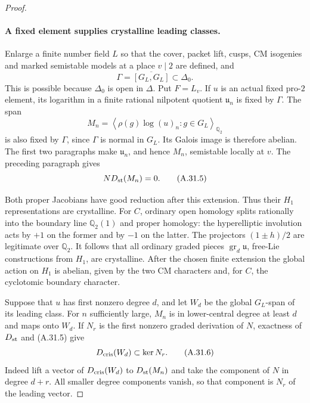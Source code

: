 \begin{proof}
\paragraph{A fixed element supplies crystalline leading classes.}
Enlarge a finite number field \(L\) so that the cover,
packet lift, cusps, CM isogenies and marked semistable
models at a place \(v\mid2\) are defined, and
\[
       \Gamma=\overline{[G_L,G_L]}\subset\Delta_0 .
\]
This is possible because \(\Delta_0\) is open in \(\Delta\).
Put \(F=L_v\). If \(u\) is an actual fixed pro-\(2\)
element, its logarithm in a finite rational nilpotent
quotient \(\mathfrak u_n\) is fixed by \(\Gamma\).
The span
\[
 M_n=\left\langle \rho(g)\log(u)_n:g\in G_L
                                            \right\rangle_{\mathbb Q_2}
                                                        \tag{A.31.4}
\]
is also fixed by \(\Gamma\), since \(\Gamma\) is normal
in \(G_L\). Its Galois image is therefore abelian.
The first two paragraphs make \(\mathfrak u_n\), and
hence \(M_n\), semistable locally at \(v\).
The preceding paragraph gives
\[
                         N D_{\rm st}(M_n)=0.           \tag{A.31.5}
\]

Both proper Jacobians have good reduction after this
extension. Thus their \(H_1\) representations are
crystalline. For \(C\), ordinary open homology splits
rationally into the boundary line \(\mathbb Q_2(1)\)
and proper homology: the hyperelliptic involution acts
by \(+1\) on the former and by \(-1\) on the latter.
The projectors \((1\pm h)/2\) are legitimate over
\(\mathbb Q_2\). It follows that all ordinary graded
pieces \(\operatorname{gr}_d\mathfrak u\), free-Lie
constructions from \(H_1\), are crystalline.
After the chosen finite extension the global action
on \(H_1\) is abelian, given by the two CM characters
and, for \(C\), the cyclotomic boundary character.

Suppose that \(u\) has first nonzero degree \(d\), and
let \(W_d\) be the global \(G_L\)-span of its leading
class. For \(n\) sufficiently large, \(M_n\) is in
lower-central degree at least \(d\) and maps onto
\(W_d\). If \(N_r\) is the first nonzero graded
derivation of \(N\), exactness of \(D_{\rm st}\)
and (A.31.5) give
\[
                 D_{\rm cris}(W_d)\subset\ker N_r .
                                                        \tag{A.31.6}
\]
Indeed lift a vector of \(D_{\rm cris}(W_d)\) to
\(D_{\rm st}(M_n)\) and take the component of \(N\)
in degree \(d+r\). All smaller degree components
vanish, so that component is \(N_r\) of the leading
vector.


\end{proof}
